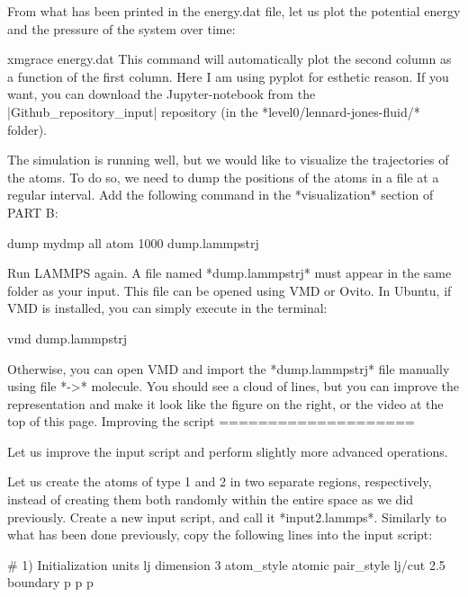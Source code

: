 From what has been printed in the energy.dat file, let us
plot the potential energy and the pressure of
the system over time:




\begin{lcverbatim}
xmgrace energy.dat
This command will automatically plot the second column as a function of the first column.
Here I am using pyplot for esthetic reason. If you want, you can download the Jupyter-notebook
from the |Github_repository_input| repository (in the *level0/lennard-jones-fluid/* folder).
\end{lcverbatim}


The simulation is running well, but we would like to
visualize the trajectories of the atoms. To do so, we need
to dump the positions of the atoms in a file at a regular
interval. Add the following command in the *visualization*
section of PART B:

\begin{lcverbatim}
dump mydmp all atom 1000 dump.lammpstrj
\end{lcverbatim}

Run LAMMPS again. A file named *dump.lammpstrj* must appear in
the same folder as your input. This file can be opened using
VMD or Ovito. In Ubuntu, if VMD is installed, you can simply
execute in the terminal:

\begin{lcverbatim}
vmd dump.lammpstrj
\end{lcverbatim}

Otherwise, you can open VMD and import the *dump.lammpstrj*
file manually using file *->* molecule. You should see a cloud
of lines, but you can improve the representation and make it
look like the figure on the right, or the video at the 
top of this page. 
Improving the script
====================

Let us improve the input script and perform slightly more
advanced operations.


Let us create the atoms of type 1 and 2 in two separate
regions, respectively, instead of creating them both randomly 
within the entire space as we did previously. Create a new input script, and call
it *input2.lammps*. Similarly to what has been done previously, copy the following lines
into the input script:

\begin{lcverbatim}
# 1) Initialization
units lj
dimension 3
atom_style atomic
pair_style lj/cut 2.5
boundary p p p
\end{lcverbatim}


